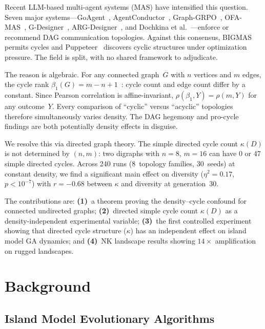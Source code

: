 \documentclass{llncs}
\begin{document}
Recent LLM-based multi-agent systems (MAS) have intensified this question.
Seven major systems---GoAgent~\cite{goagent2026},
AgentConductor~\cite{agentconductor2026}, Graph-GRPO~\cite{graphgrpo2026},
OFA-MAS~\cite{ofamas2026}, G-Designer~\cite{gdesigner2025},
ARG-Designer~\cite{argdesigner2026}, and Dochkina et
al.~\cite{dochkina2026}---enforce or recommend DAG communication topologies.
Against this consensus, BIGMAS~\cite{bigmas2026} permits cycles and
Puppeteer~\cite{puppeteer2025} discovers cyclic structures under optimization
pressure. The field is split, with no shared framework to adjudicate.

The reason is algebraic. For any connected graph~$G$ with $n$ vertices and $m$
edges, the cycle rank $\beta_1(G) = m - n + 1$~\cite{hatcher2002algebraic}:
cycle count and edge count differ by a constant. Since Pearson correlation is
affine-invariant, $\rho(\beta_1, Y) = \rho(m, Y)$ for any outcome~$Y$. Every
comparison of ``cyclic'' versus ``acyclic'' topologies therefore simultaneously
varies density. The DAG hegemony and pro-cycle findings are both potentially
density effects in disguise.

We resolve this via directed graph theory. The simple directed cycle count
$\kappa(D)$ is not determined by $(n, m)$: two digraphs with $n = 8$, $m = 16$
can have 0 or 47 simple directed cycles. Across 240 runs (8~topology families,
30~seeds) at constant density, we find a significant main effect on diversity
($\eta^2 = 0.17$, $p < 10^{-7}$) with $r = -0.68$ between $\kappa$ and
diversity at generation~30.

The contributions are: \textbf{(1)}~a theorem proving the density--cycle
confound for connected undirected graphs; \textbf{(2)}~directed simple
cycle count $\kappa(D)$ as a density-independent experimental variable;
\textbf{(3)}~the first controlled experiment showing that directed cycle
structure ($\kappa$) has an independent effect on island model GA dynamics; and
\textbf{(4)}~NK landscape results showing $14\times$ amplification on
rugged landscapes.

\section{Background}
\label{sec:background}

\subsection{Island Model Evolutionary Algorithms}
\end{document}
